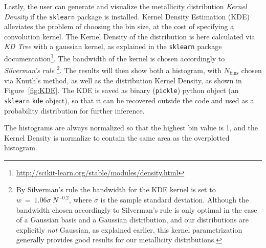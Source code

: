 \documentclass{emulateapj}
\begin{document}
Lastly, the user can generate and visualize the metallicity distribution \emph{Kernel Density} if the \verb=sklearn= package is installed. Kernel Density Estimation (KDE) alleviates the problem of choosing the bin size, at the cost of specifying a convolution kernel. The Kernel Density of the distribution is here calculated via  \emph{KD Tree} with a gaussian kernel, as explained in the \verb=sklearn= package documentation\footnote{\url{http://scikit-learn.org/stable/modules/density.html}}. The bandwidth of the kernel is chosen accordingly to \emph{Silverman's rule} \citep{silverman86}\footnote{By Silverman's rule the bandwidth for the KDE kernel is set to $w~=~1.06\sigma~N^{-0.2}$, where $\sigma$ is the sample standard deviation. Although the bandwidth chosen accordingly to Silverman's rule is only optimal in the case of a Gaussian basis and a Gaussian distribution, and our distributions are explicitly \emph{not} Gaussian, as explained earlier, this kernel parametrization generally provides good results for our metallicity distributions.}. The results will then show both a histogram, with $N_\mathrm{bins}$ chosen via Knuth's method, as well as the distribution Kernel Density, as shown in Figure~\ref{fig:KDE}. The KDE is saved as binary (\verb=pickle=) python object (an \verb=sklearn= \verb=kde= object), so that it can be recovered outside the code and used as a probability distribution for further inference.

The histograms are always normalized so that the highest bin value is 1, and the  Kernel Density is normalize to contain the same area as the overplotted histogram. %
\end{document}
